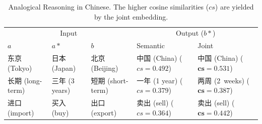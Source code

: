 \begin{table}[h!]
    \centering
    \begin{CJK}{UTF8}{gbsn}
        \begin{tabularx}{\textwidth}{lllbb}
            \toprule
            \multicolumn{3}{c}{Input} & \multicolumn{2}{c}{Output ($b*$)} \\
            \cmidrule(lr){1-3} \cmidrule(lr){4-5} $a$ & $a*$ & $b$ & Semantic & Joint \\\midrule
            \vspace{0.2cm} 东京 (Tokyo) & 日本 (Japan) & 北京 (Beijing) & 中国 (China) \newline ($cs=0.492$) & 中国 (China) \newline ($\bm{cs=0.531}$) \\
            \vspace{0.2cm} 长期 (long-term) & 三年 (3 years) & 短期 (short-term) & 一年 (1 year) \newline ($cs=0.379$) & \mbox{两周} (\mbox{2 weeks}) \newline ($\bm{cs=0.387}$) \\
            进口 (import) & 买入 (buy) & 出口 (export) & 卖出 (sell) \newline ($cs=0.364$) & 卖出 (sell) \newline ($\bm{cs=0.442}$)\\\bottomrule
        \end{tabularx}
    \end{CJK}
    \caption[Analogical Reasoning in Chinese]{Analogical Reasoning in Chinese. The higher cosine similarities ($cs$) are yielded by the joint embedding.}
    \label{tab:analysis_analogy1}
\end{table}

